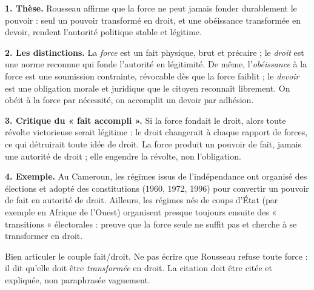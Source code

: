 \documentclass[11pt]{article}
\begin{document}
\begin{corrige}
\textbf{1. Thèse.} Rousseau affirme que la force ne peut jamais fonder durablement le pouvoir : seul un pouvoir transformé en droit, et une obéissance transformée en devoir, rendent l'autorité politique stable et légitime.

\textbf{2. Les distinctions.} La \emph{force} est un fait physique, brut et précaire ; le \emph{droit} est une norme reconnue qui fonde l'autorité en légitimité. De même, l'\emph{obéissance} à la force est une soumission contrainte, révocable dès que la force faiblit ; le \emph{devoir} est une obligation morale et juridique que le citoyen reconnaît librement. On obéit à la force par nécessité, on accomplit un devoir par adhésion.

\textbf{3. Critique du « fait accompli ».} Si la force fondait le droit, alors toute révolte victorieuse serait légitime : le droit changerait à chaque rapport de forces, ce qui détruirait toute idée de droit. La force produit un pouvoir de fait, jamais une autorité de droit ; elle engendre la révolte, non l'obligation.

\textbf{4. Exemple.} Au Cameroun, les régimes issus de l'indépendance ont organisé des élections et adopté des constitutions (1960, 1972, 1996) pour convertir un pouvoir de fait en autorité de droit. Ailleurs, les régimes nés de coups d'État (par exemple en Afrique de l'Ouest) organisent presque toujours ensuite des « transitions » électorales : preuve que la force seule ne suffit pas et cherche à se transformer en droit.
\end{corrige}

\begin{attention}
Bien articuler le couple fait/droit. Ne pas écrire que Rousseau refuse toute force : il dit qu'elle doit être \emph{transformée} en droit. La citation doit être citée et expliquée, non paraphrasée vaguement.
\end{attention}
\end{document}

